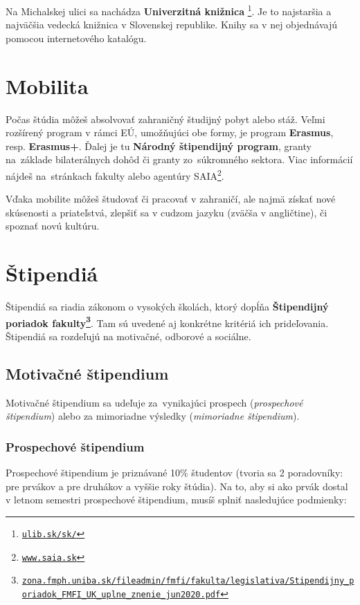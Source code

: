 Na Michalskej ulici sa nachádza \textbf{Univerzitná knižnica}%
\footnote{\href{http://www.ulib.sk/sk/}{\texttt{ulib.sk/sk/}}%
}. Je to najstaršia a najväčšia vedecká knižnica v Slovenskej republike.
Knihy sa v nej objednávajú pomocou internetového katalógu. 

\section{Mobilita}

Počas štúdia môžeš absolvovať zahraničný študijný pobyt alebo stáž.
Veľmi rozšírený program v rámci EÚ, umožňujúci obe formy, je program
\textbf{Erasmus}, resp. \textbf{Erasmus+}. Ďalej je tu \textbf{Národný štipendij\-ný program},
granty na~základe bilaterálnych dohôd či granty zo~súkromného sektora.
Viac informácií nájdeš na~stránkach fakulty alebo agentúry SAIA\footnote{\href{https://www.saia.sk}{\texttt{www.saia.sk}}%
}.

Vďaka mobilite môžeš študovať či pracovať v zahraničí, ale najmä získať
nové skúsenosti a priateľstvá, zlepšiť sa v cudzom jazyku (zväčša
v angličtine), či spoznať novú kultúru.

\section{Štipendiá}

Štipendiá sa riadia zákonom o vysokých školách, ktorý dopĺňa \textbf{Štipendijný
poriadok fakulty\footnote{\href{https://zona.fmph.uniba.sk/fileadmin/fmfi/fakulta/legislativa/Stipendijny_poriadok_FMFI_UK_uplne_znenie_jun2020.pdf}{\texttt{zona.fmph.uniba.sk/fileadmin/fmfi/fakulta/legislativa/\-Stipendijny\_poriadok\_FMFI\_UK\_uplne\_znenie\_jun2020.pdf}}}}. Tam sú uvedené aj konkrétne kri\-té\-riá ich prideľovania. Štipendiá sa rozdeľujú na motivačné, odborové a sociálne. 

\subsection{Motivačné štipendium}

Motivačné štipendium sa udeľuje za~vynikajúci prospech (\emph{prospechové štipendium}) alebo za mimoriadne výsledky (\emph{mimoriadne štipendium}).

\subsubsection{Prospechové štipendium}
Prospechové štipendium je priznávané 10\% študentov (tvoria sa 2 poradovníky: pre prvákov a pre druhákov a vyššie roky štúdia). Na to, aby si ako prvák dostal v letnom semestri prospechové štipendium, musíš splniť nasledujúce podmienky: 

